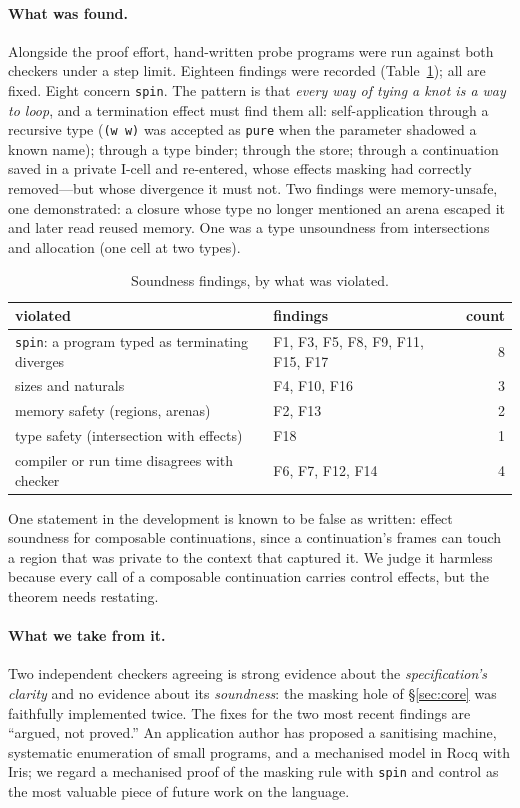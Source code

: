 \documentclass[acmsmall,screen,review]{acmart}
\newcommand{\cd}[1]{\texttt{#1}}
\begin{document}
\paragraph{What was found.} Alongside the proof effort, hand-written
probe programs were run against both checkers under a step limit.
Eighteen findings were recorded (Table~\ref{tab:findings}); all are
fixed. Eight concern \cd{spin}. The pattern is that \emph{every way of
tying a knot is a way to loop}, and a termination effect must find
them all: self-application through a recursive type (\cd{(w w)} was
accepted as \cd{pure} when the parameter shadowed a known name);
through a type binder; through the store; through a continuation saved
in a private I-cell and re-entered, whose effects masking had
correctly removed---but whose divergence it must not. Two findings
were memory-unsafe, one demonstrated: a closure whose type no longer
mentioned an arena escaped it and later read reused memory. One was a
type unsoundness from intersections and allocation (one cell at two
types).

\begin{table}[t]
\caption{Soundness findings, by what was violated.}
\label{tab:findings}
\small
\begin{tabular}{@{}llr@{}}
\toprule
violated & findings & count\\
\midrule
\cd{spin}: a program typed as terminating diverges & F1, F3, F5, F8, F9, F11, F15, F17 & 8\\
sizes and naturals & F4, F10, F16 & 3\\
memory safety (regions, arenas) & F2, F13 & 2\\
type safety (intersection with effects) & F18 & 1\\
compiler or run time disagrees with checker & F6, F7, F12, F14 & 4\\
\bottomrule
\end{tabular}
\end{table}

One statement in the development is known to be false as written:
effect soundness for composable continuations, since a continuation's
frames can touch a region that was private to the context that
captured it. We judge it harmless because every call of a composable
continuation carries control effects, but the theorem needs restating.

\paragraph{What we take from it.} Two independent checkers agreeing is
strong evidence about the \emph{specification's clarity} and no
evidence about its \emph{soundness}: the masking hole of
\S\ref{sec:core} was faithfully implemented twice. The fixes for the two most recent findings are ``argued, not
proved.'' An application author has proposed a sanitising machine,
systematic enumeration of small programs, and a mechanised model in
Rocq with Iris; we regard a mechanised proof of the masking rule with
\cd{spin} and control as the most valuable piece of future work on the
language.
\end{document}

